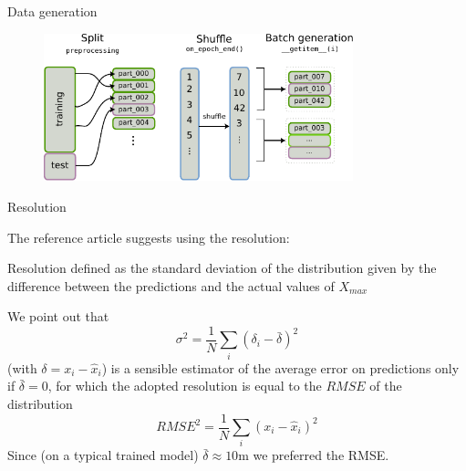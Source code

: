 \documentclass{beamer}
\begin{document}
\begin{frame}{Data generation}
    \begin{figure}
        \centering
        \includegraphics[width=0.8\textwidth]{figures/data_generation.pdf}
    \end{figure}
\end{frame}

\begin{frame}{Resolution}

    The reference article suggests using the resolution:
    \begin{block}{Resolution}
        defined as the standard deviation of the distribution given by the difference between the predictions and the actual values of $X_{max}$
    \end{block}

    We point out that 
    \[\sigma^2 = \frac{1}{N}\sum_i (\delta_i - \bar{\delta})^2\]
    (with $\delta = x_i - \hat{x}_i$) is a sensible estimator of the average error on predictions only if $\bar{\delta} = 0$, for which the adopted resolution is equal 
    to the $RMSE$ of the distribution
    \[ RMSE^2 = \frac{1}{N}\sum_i(x_i - \hat{x}_i)^2 \]
    Since (on a typical trained model) $\bar{\delta} \approx 10$m we preferred the RMSE.
\end{frame}
\end{document}
